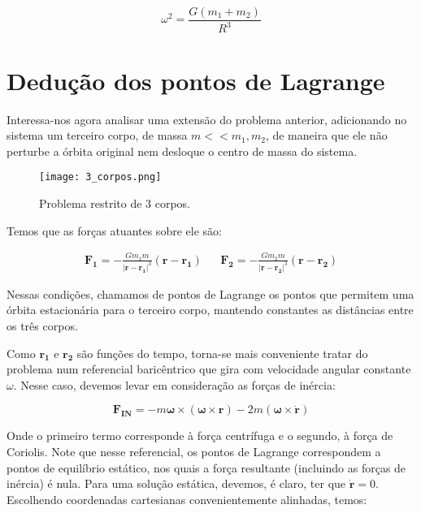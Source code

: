 \begin{equation}
\omega^2 = \frac{G(m_1+m_2)}{R^3}
\end{equation}

\section{Dedução dos pontos de Lagrange}


Interessa-nos agora analisar uma extensão do problema anterior, adicionando no sistema um terceiro corpo, de massa $m<<m_1,m_2$, de maneira que ele não perturbe a órbita original nem desloque o centro de massa do sistema. 

\begin{figure}[!h]
\centering
\texttt{[image: 3\_corpos.png]}
\caption{Problema restrito de 3 corpos.}
\end{figure}


Temos que as forças atuantes sobre ele são:

\begin{align}
\mathbf{F_1} = -\frac{Gm_1m}{|\mathbf{r}-\mathbf{r_1}|^3}(\mathbf{r}-\mathbf{r_1}) && \mathbf{F_2} = -\frac{Gm_2m}{|\mathbf{r}-\mathbf{r_2}|^3}(\mathbf{r}-\mathbf{r_2})
\end{align}

Nessas condições, chamamos de pontos de Lagrange os pontos que permitem uma órbita estacionária para o terceiro corpo, mantendo constantes as distâncias entre os três corpos.

Como $\mathbf{r_1}$ e $\mathbf{r_2}$ são funções do tempo, torna-se mais conveniente tratar do problema num referencial baricêntrico que gira com velocidade angular constante $\omega$. Nesse caso, devemos levar em consideração as forças de inércia:

\begin{equation}
\mathbf{F_{IN}} = -m\mathbf{\omega} \times (\mathbf{\omega} \times \mathbf{r}) -2m(\mathbf{\omega} \times \mathbf{\dot{r}}) 
\end{equation}

Onde o primeiro termo corresponde à força centrífuga e o segundo, à força de Coriolis. Note que nesse referencial, os pontos de Lagrange correspondem a pontos de equilíbrio estático, nos quais a força resultante (incluindo as forças de inércia) é nula. Para uma solução estática, devemos, é claro, ter que $\mathbf{\dot{r}}=0$. Escolhendo coordenadas cartesianas convenientemente alinhadas, temos:

